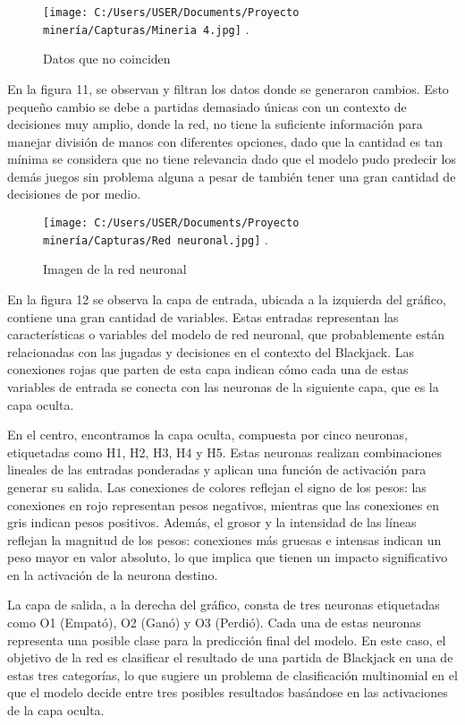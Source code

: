 \documentclass[conference,final,]{IEEEtran}
\begin{document}
\begin{figure}[htbp]
\centering
\texttt{[image: C:/Users/USER/Documents/Proyecto minería/Capturas/Mineria 4.jpg]}
\DeclareGraphicsExtensions.
\caption{Datos que no coinciden}
\label{Mineria 4}
\end{figure}

En la figura 11, se observan y filtran los datos donde se generaron
cambios. Esto pequeño cambio se debe a partidas demasiado únicas con un
contexto de decisiones muy amplio, donde la red, no tiene la suficiente
información para manejar división de manos con diferentes opciones, dado
que la cantidad es tan mínima se considera que no tiene relevancia dado
que el modelo pudo predecir los demás juegos sin problema alguna a pesar
de también tener una gran cantidad de decisiones de por medio.

\begin{figure}[htbp]
\centering
\texttt{[image: C:/Users/USER/Documents/Proyecto minería/Capturas/Red neuronal.jpg]}
\DeclareGraphicsExtensions.
\caption{Imagen de la red neuronal}
\label{Red neuronal}
\end{figure}

En la figura 12 se observa la capa de entrada, ubicada a la izquierda
del gráfico, contiene una gran cantidad de variables. Estas entradas
representan las características o variables del modelo de red neuronal,
que probablemente están relacionadas con las jugadas y decisiones en el
contexto del Blackjack. Las conexiones rojas que parten de esta capa
indican cómo cada una de estas variables de entrada se conecta con las
neuronas de la siguiente capa, que es la capa oculta.

En el centro, encontramos la capa oculta, compuesta por cinco neuronas,
etiquetadas como H1, H2, H3, H4 y H5. Estas neuronas realizan
combinaciones lineales de las entradas ponderadas y aplican una función
de activación para generar su salida. Las conexiones de colores reflejan
el signo de los pesos: las conexiones en rojo representan pesos
negativos, mientras que las conexiones en gris indican pesos positivos.
Además, el grosor y la intensidad de las líneas reflejan la magnitud de
los pesos: conexiones más gruesas e intensas indican un peso mayor en
valor absoluto, lo que implica que tienen un impacto significativo en la
activación de la neurona destino.

La capa de salida, a la derecha del gráfico, consta de tres neuronas
etiquetadas como O1 (Empató), O2 (Ganó) y O3 (Perdió). Cada una de estas
neuronas representa una posible clase para la predicción final del
modelo. En este caso, el objetivo de la red es clasificar el resultado
de una partida de Blackjack en una de estas tres categorías, lo que
sugiere un problema de clasificación multinomial en el que el modelo
decide entre tres posibles resultados basándose en las activaciones de
la capa oculta.
\end{document}
